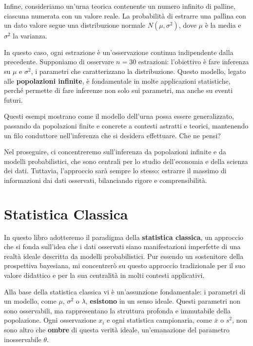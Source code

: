 \documentclass[
  11pt,
]{book}
\theoremstyle{mytheoremstyle}
\theoremstyle{mydefstyle}
\begin{document}
Infine, consideriamo un'urna teorica contenente un numero infinito di palline, ciascuna numerata con un valore reale. La probabilità di estrarre una pallina con un dato valore segue una distribuzione normale \(N(\mu, \sigma^2)\), dove \(\mu\) è la media e \(\sigma^2\) la varianza.

In questo caso, ogni estrazione è un'osservazione continua indipendente dalla precedente. Supponiamo di osservare \(n = 30\) estrazioni: l'obiettivo è fare inferenza su \(\mu\) e \(\sigma^2\), i parametri che caratterizzano la distribuzione. Questo modello, legato alle \textbf{popolazioni infinite}, è fondamentale in molte applicazioni statistiche, perché permette di fare inferenze non solo sui parametri, ma anche su eventi futuri.

Questi esempi mostrano come il modello dell'urna possa essere generalizzato, passando da popolazioni finite e concrete a contesti astratti e teorici, mantenendo un filo conduttore nell'inferenza che si desidera effettuare. Che ne pensi?

Nel proseguire, ci concentreremo sull'inferenza da popolazioni infinite e da modelli probabilistici, che sono centrali per lo studio dell'economia e della scienza dei dati. Tuttavia, l'approccio sarà sempre lo stesso: estrarre il massimo di informazioni dai dati osservati, bilanciando rigore e comprensibilità.

\section{Statistica Classica}\label{statistica-classica}

In questo libro adotteremo il paradigma della \textbf{statistica classica}, un approccio che si fonda sull'idea che i dati osservati siano manifestazioni imperfette di una realtà ideale descritta da modelli probabilistici. Pur essendo un sostenitore della prospettiva bayesiana, mi concentrerò su questo approccio tradizionale per il suo valore didattico e per la sua centralità in molti contesti applicativi.

Alla base della statistica classica vi è un'assunzione fondamentale: i parametri di un modello, come \(\mu\), \(\sigma^2\) o \(\lambda\), \textbf{esistono} in un senso ideale. Questi parametri non sono osservabili, ma rappresentano la struttura profonda e immutabile della popolazione. Ogni osservazione \(x_i\) e ogni statistica campionaria, come \(\bar{x}\) o \(s^2\), non sono altro che \textbf{ombre} di questa verità ideale, un'emanazione del parametro inosservabile \(\theta\).
\end{document}
